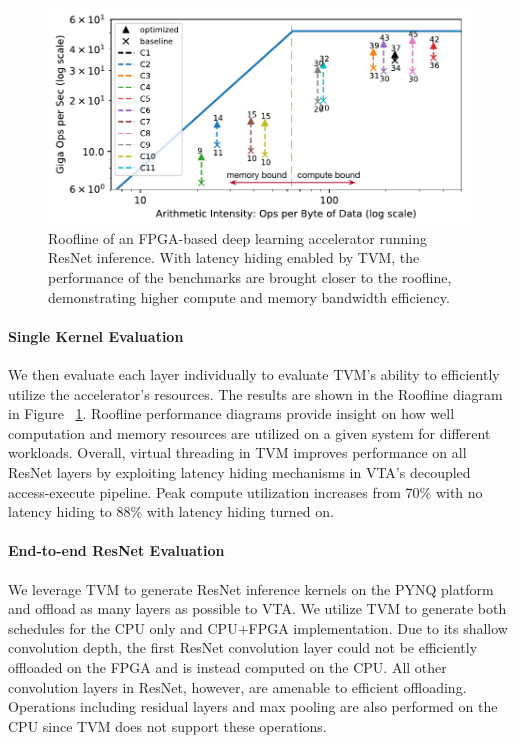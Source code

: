 \documentclass[sigconf]{acmart}
\begin{document}
\begin{figure}[!t]
\centering
\includegraphics[width=1\columnwidth]{figures/vta_roofline}
\caption{\small{Roofline of an FPGA-based deep learning accelerator running ResNet inference. With latency hiding enabled by TVM, the performance of the benchmarks are brought closer to the roofline, demonstrating higher compute and memory bandwidth efficiency.}}
\label{fig:fpga_latencyhiding}
\end{figure}

\paragraph{Single Kernel Evaluation}
We then evaluate each layer individually to evaluate TVM's ability to efficiently utilize the accelerator's resources.
The results are shown in the Roofline diagram in Figure ~\ref{fig:fpga_latencyhiding}.
Roofline performance diagrams provide insight on how well computation and memory resources are utilized on a given system for different workloads.
Overall, virtual threading in TVM improves performance on all ResNet layers by exploiting latency hiding mechanisms in VTA's decoupled access-execute pipeline.
Peak compute utilization increases from 70\% with no latency hiding to 88\% with latency hiding turned on.

\paragraph{End-to-end ResNet Evaluation}
We leverage TVM to generate ResNet inference kernels on the PYNQ platform and offload as many layers as possible to VTA.
We utilize TVM to generate both schedules for the CPU only and CPU+FPGA implementation.
Due to its shallow convolution depth, the first ResNet convolution layer could not be efficiently offloaded on the FPGA and is instead computed on the CPU.
All other convolution layers in ResNet, however, are amenable to efficient offloading.
Operations including residual layers and max pooling are also performed on the CPU since TVM does not support these operations.
\end{document}
